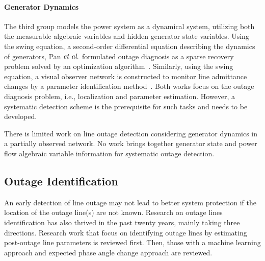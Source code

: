 \paragraph{Generator Dynamics}
The third group models the power system as a dynamical system, utilizing both the measurable algebraic variables and hidden generator state variables. Using the swing equation, a second-order differential equation describing the dynamics of generators, Pan $\textit{et al}.$ formulated outage diagnosis as a sparse recovery problem solved by an optimization algorithm~\cite{Pan2015a}. Similarly, using the swing equation, a visual observer network is constructed to monitor line admittance changes by a parameter identification method~\cite{Yang2016b}. Both works focus on the outage diagnosis problem, i.e., localization and parameter estimation. However, a systematic detection scheme is the prerequisite for such tasks and needs to be developed.


There is limited work on line outage detection considering generator dynamics in a partially observed network. No work brings together generator state and power flow algebraic variable information for systematic outage detection.



\subsection{Outage Identification} %
\label{sub:outage_identification}
An early detection of line outage may not lead to better system protection if the location of the outage line(s) are not known. Research on outage lines identification has also thrived in the past twenty years, mainly taking three directions. Research work that focus on identifying outage lines by estimating post-outage line parameters is reviewed first. Then, those with a machine learning approach and expected phase angle change approach are reviewed.

